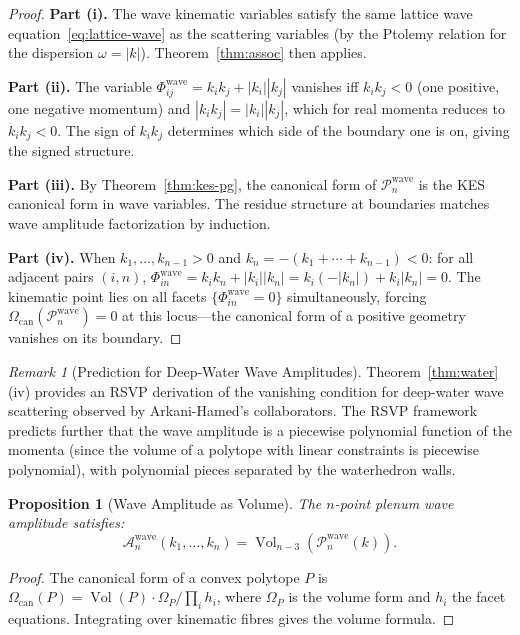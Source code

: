 \documentclass[12pt, oneside]{amsart}
\theoremstyle{plain}
\newtheorem{proposition}[theorem]{Proposition}
\theoremstyle{definition}
\theoremstyle{remark}
\newtheorem{remark}[theorem]{Remark}
\DeclareMathOperator{\Vol}{Vol}
\newcommand{\Phif}{\Phi}   %
\newcommand{\Amp}{\mathcal{A}}
\newcommand{\CF}{\Omega_{\mathrm{can}}}
\begin{document}
\begin{proof}
\textbf{Part (i).} The wave kinematic variables satisfy the same lattice wave equation~\eqref{eq:lattice-wave} as the scattering variables (by the Ptolemy relation for the dispersion $\omega = |k|$). Theorem~\ref{thm:assoc} then applies.

\textbf{Part (ii).} The variable $\Phif_{ij}^{\mathrm{wave}} = k_ik_j + |k_i||k_j|$ vanishes iff $k_ik_j < 0$ (one positive, one negative momentum) and $|k_ik_j| = |k_i||k_j|$, which for real momenta reduces to $k_ik_j < 0$. The sign of $k_ik_j$ determines which side of the boundary one is on, giving the signed structure.

\textbf{Part (iii).} By Theorem~\ref{thm:kes-pg}, the canonical form of $\mathcal{P}_n^{\mathrm{wave}}$ is the KES canonical form in wave variables. The residue structure at boundaries matches wave amplitude factorization by induction.

\textbf{Part (iv).} When $k_1,\ldots,k_{n-1} > 0$ and $k_n = -(k_1+\cdots+k_{n-1}) < 0$: for all adjacent pairs $(i,n)$, $\Phif_{in}^{\mathrm{wave}} = k_i k_n + |k_i||k_n| = k_i(-|k_n|) + k_i|k_n| = 0$. The kinematic point lies on all facets $\{\Phif_{in}^{\mathrm{wave}} = 0\}$ simultaneously, forcing $\CF(\mathcal{P}_n^{\mathrm{wave}}) = 0$ at this locus---the canonical form of a positive geometry vanishes on its boundary.
\end{proof}

\begin{remark}[Prediction for Deep-Water Wave Amplitudes]
Theorem~\ref{thm:water}(iv) provides an RSVP derivation of the vanishing condition for deep-water wave scattering observed by Arkani-Hamed's collaborators. The RSVP framework predicts further that the wave amplitude is a piecewise polynomial function of the momenta (since the volume of a polytope with linear constraints is piecewise polynomial), with polynomial pieces separated by the waterhedron walls.
\end{remark}

\begin{proposition}[Wave Amplitude as Volume]
The $n$-point plenum wave amplitude satisfies:
\[
  \Amp_n^{\mathrm{wave}}(k_1,\ldots,k_n) = \Vol_{n-3}(\mathcal{P}_n^{\mathrm{wave}}(k)).
\]
\end{proposition}

\begin{proof}
The canonical form of a convex polytope $P$ is $\CF(P) = \Vol(P) \cdot \Omega_P / \prod_i h_i$, where $\Omega_P$ is the volume form and $h_i$ the facet equations. Integrating over kinematic fibres gives the volume formula.
\end{proof}
\end{document}
